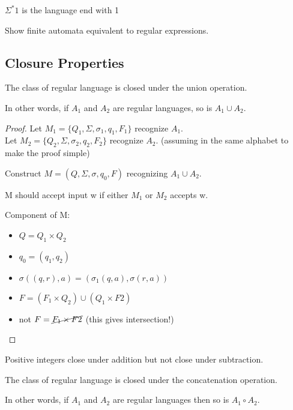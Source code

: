 \begin{eg}
    \(\Sigma^*1\) is the language end with 1
\end{eg}

\begin{remark}
    Show finite automata equivalent to regular expressions.
\end{remark}

\subsection{Closure Properties}
\begin{theorem}
    The class of regular language is closed under the union operation.

    In other words, if \(A_1\) and \(A_2\) are regular languages, so is \(A_1 \cup A_2\).   
\end{theorem}
\begin{proof}
    Let \(M_1 = \{ Q_1, \Sigma, \sigma_1, q_1, F_1 \} \)  recognize \(A_1\). \\
    Let \(M_2 = \{ Q_2, \Sigma, \sigma_2, q_2, F_2 \} \)  recognize \(A_2\). 
    (assuming in the same alphabet to make the proof simple)

    Construct \(M = (Q, \Sigma, \sigma, q_0, F)\) recognizing \(A_1 \cup A_2\).  

    M should accept input w if either \(M_1\)  or \(M_2\)  accepts w.

    Component of M:
    \begin{itemize}
        \item \(Q = Q_1 \times Q_2\) 
        \item \(q_0 = (q_1, q_2)\) 
        \item \(\sigma((q, r), a) = (\sigma_1(q, a), \sigma(r, a))\) 
        \item \(F = (F_1 \times Q_2) \cup (Q_1 \times F2)\) 
        \item  not \(F = \cancel{F_1 \times F2}\) (this gives intersection!) 
    \end{itemize}
\end{proof}

\begin{eg}
    Positive integers close under addition but not close under subtraction.
\end{eg}

\begin{theorem}
    The class of regular language is closed under the concatenation operation.

    In other words, if \(A_1\) and \(A_2\) are regular languages then so is \(A_1 \circ A_2\).   
\end{theorem}


